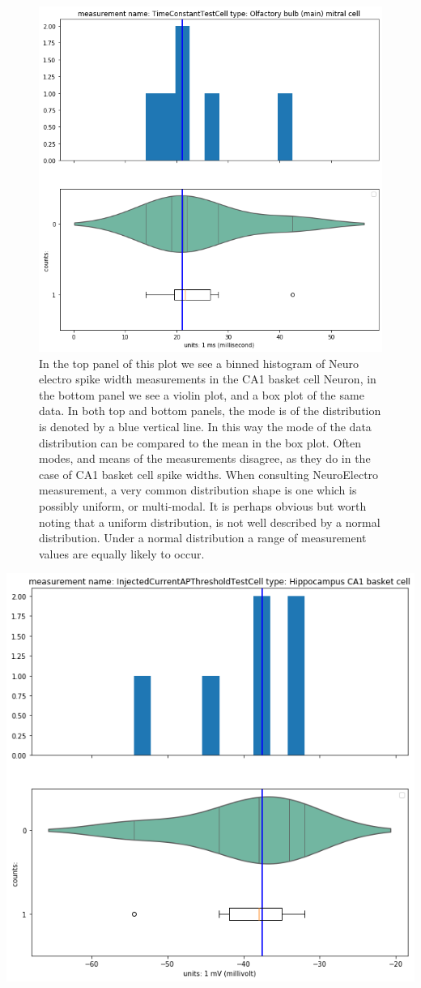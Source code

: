 \begin{center}
\begin{figure}
     \includegraphics[width=0.7\linewidth]{notebooks_converted/needata_thesis_files/needata_thesis_5_23}
\caption{In the top panel of this plot we see a binned histogram of Neuro electro spike width measurements in the CA1 basket cell Neuron, in the bottom panel we see a violin plot, and a box plot of the same data. In both top and bottom panels, the mode is of the distribution is denoted by a blue vertical line. In this way the mode of the data distribution can be compared to the mean in the box plot. Often modes, and means of the measurements disagree, as they do in the case of CA1 basket cell spike widths. When consulting NeuroElectro measurement, a very common distribution shape is one which is possibly uniform, or multi-modal. It is perhaps obvious but worth noting that a uniform distribution, is not well described by a normal distribution. Under a normal distribution a range of measurement values are equally likely to occur.}
\end{figure}
\end{center}

    
\begin{center}
   \includegraphics[width=0.7\linewidth]{notebooks_converted/needata_thesis_files/needata_thesis_5_10}
\end{center}

